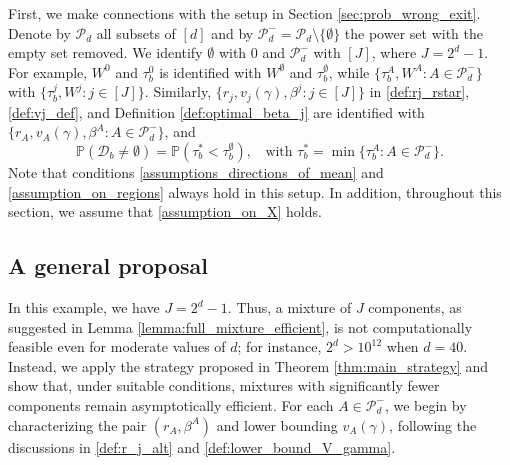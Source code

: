 \documentclass[aap,preprint]{imsart}
\newcommand{\Pro}{{\mathbb{P}}}
\theoremstyle{plain}
\theoremstyle{definition}
\begin{document}
First, we make connections with the setup in Section \ref{sec:prob_wrong_exit}. Denote by $\mathcal{P}_d$ all subsets of $[d]$  and by $\mathcal{P}_d^{-} = \mathcal{P}_d \setminus \{\emptyset\}$ the power set with the empty set removed. We identify $\emptyset$ with $0$ and $\mathcal{P}_d^{-}$ with $[J]$, where $J = 2^d-1$. For example, $W^{0}$ and $\tau_b^0$ is identified with $W^{\emptyset}$ and $\tau_b^\emptyset$, while
$\{\tau_b^A, W^{A}: A \in \mathcal{P}_d^{-}\}$ with $\{\tau_b^j, W^{j}:j\in [J]\}$.  Similarly, $\{r_{j}, v_j(\gamma), \beta^j: j \in [J]\}$  
in \eqref{def:rj_rstar}, \eqref{def:vj_def}, and Definition \ref{def:optimal_beta_j} are identified with $\{r_{A}, v_A(\gamma), \beta^{A}: A  \in \mathcal{P}_d^{-}\}$, and 
\begin{equation}
    \label{def:siegmund}
\Pro\left(\mathcal{D}_b \neq \emptyset\right) =
\Pro\left(\tau_b^* < \tau_b^{\emptyset}\right), \;\; \text{ with }
\tau_b^{*} = \min\{\tau_b^{A}: A \in \mathcal{P}_d^{-}\}.
\end{equation}
Note that conditions \eqref{assumptions_directions_of_mean} and  \eqref{assumption_on_regions} always hold in this setup. In addition, throughout this section, we assume that \eqref{assumption_on_X} holds.

\subsection{A general proposal}
In this example, we have $J = 2^d - 1$. Thus, a mixture of $J$ components, as suggested in Lemma \ref{lemma:full_mixture_efficient}, is not computationally feasible even for moderate values of $d$; for instance, $2^d > 10^{12}$ when $d = 40$. Instead, we apply the strategy proposed in Theorem \ref{thm:main_strategy} and show that, under suitable conditions, mixtures with significantly fewer components remain asymptotically efficient. For each $A \in \mathcal{P}_d^{-}$, we begin by characterizing the pair $(r_A, \beta^A)$ and lower bounding $v_A(\gamma)$, following the discussions in \eqref{def:r_j_alt} and \eqref{def:lower_bound_V_gamma}.
\end{document}
